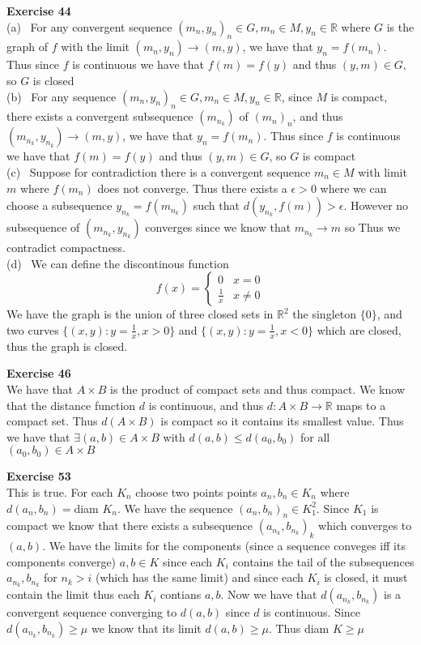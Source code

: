 \documentclass[12pt]{article}
\newenvironment{ques}[1]{\textbf{Exercise #1}\vspace{1 mm}\\ }{\bigskip}
\theoremstyle{definition}
\newcommand{\R}{\mathbb R}
\begin{document}
\begin{ques}{44}
	(a) \ For any convergent sequence $(m_n, y_n)_n \in G, m_n \in M,
	y_n \in \R$ where $G$ is the graph of $f$ with the limit $(m_n,y_n) \to
	(m,y)$, we have that $y_n = f(m_n)$. Thus since $f$ is continuous we have
	that $f(m) = f(y)$ and thus $(y,m) \in G$, so $G$ is closed\\
	(b) \ For any sequence $(m_n, y_n)_n \in G, m_n \in M,
	y_n \in \R$, since $M$ is compact, there exists a convergent subsequence
	$(m_{n_k})$ of $(m_n)_n$, and thus $(m_{n_k},y_{n_k}) \to
	(m,y)$, we have that $y_n = f(m_n)$. Thus since $f$ is continuous we have
	that $f(m) = f(y)$ and thus $(y,m) \in G$, so $G$ is compact\\
	(c) \ Suppose for contradiction there is a convergent sequence $m_n \in M$
	with limit $m$ where $f(m_n)$ does not converge. Thus there exists a
	$\epsilon > 0$ where we can choose a subsequence $y_{n_k} = f(m_{n_k})$
	such that $d(y_{n_k}, f(m)) > \epsilon$. However no subsequence of 
	$(m_{n_k}, y_{n_k})$ converges since we know that $m_{n_k} \to m$ so 
	Thus we contradict compactness.\\
	(d) \ We can define the discontinous function
	$$f(x) = \begin{cases} 
      0 & x = 0 \\
      \frac{1}{x} & x \neq 0
   \end{cases}$$
   We have the graph is the union of three closed sets in $\R^2$ the singleton
   $\{0\}$, and two curves $\{(x,y): y = \frac 1 x, x > 0\}$ and $\{(x,y): y =
   \frac 1 x, x < 0\}$ which are closed, thus the graph is closed.
\end{ques}

\begin{ques}{46}
	We have that $A \times B$ is the product of compact sets and thus compact.
	We know that the distance function $d$ is continuous, and thus $d: A \times
	B \to \R$ maps to a compact set. Thus $d(A \times B)$ is compact so it
	contains its smallest value. Thus we have that $\exists (a,b) \in A \times
	B$ with $d(a,b) \leq d(a_0,b_0)$ for all $(a_0,b_0) \in A \times B$\\
\end{ques}

\begin{ques}{53}
	This is true. For each $K_n$ choose two points points $a_n,b_n \in K_n$
	where $d(a_n,b_n) = $diam $K_n$. We have the sequence $(a_n,b_n)_n \in
	K_1^2$. Since $K_1$ is compact we know that there exists a subsequence
	$(a_{n_k}, b_{n_k})_k$ which converges to $(a,b)$. We have the limits
	for the components (since a sequence conveges iff its components converge)
	$a,b \in K$ since each $K_i$ contains the tail of the subsequences
	$a_{n_k}, b_{n_k}$ for $n_k > i$ (which has the same limit) and since
	each $K_i$ is closed, it must contain the limit thus each $K_i$
	contians $a,b$.  Now we have that $d(a_{n_k},b_{n_k})$ is a convergent
	sequence converging to $d(a,b)$ since $d$ is continuous. Since
	$d(a_{n_k},b_{n_k}) \geq \mu$ we know that its limit $d(a,b) \geq \mu$.
	Thus diam $K \geq \mu$
\end{ques}
\end{document}
